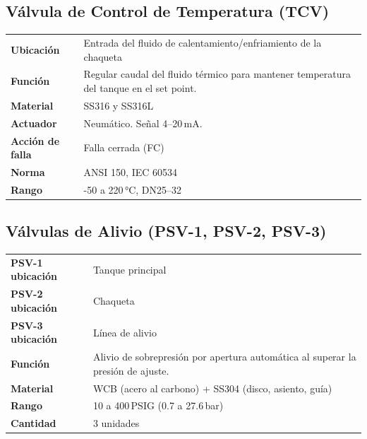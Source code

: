 \documentclass[12pt,letterpaper]{article}
\begin{document}
\subsection{Válvula de Control de Temperatura (TCV)}

\begin{especbox}[title={TCV — SAMSON Tipo 3241 + Actuador 3271}]
\renewcommand{\arraystretch}{1.25}
\begin{tabular}{L{4cm} L{9.5cm}}
\textbf{Ubicación}       & Entrada del fluido de calentamiento/enfriamiento de la chaqueta \\
\textbf{Función}         & Regular caudal del fluido térmico para mantener temperatura del tanque en el set point. \\
\textbf{Material}        & SS316 y SS316L \\
\textbf{Actuador}        & Neumático. Señal 4--20\,mA. \\
\textbf{Acción de falla} & Falla cerrada (FC) \\
\textbf{Norma}           & ANSI 150, IEC 60534 \\
\textbf{Rango}           & -50 a 220\,°C, DN25--32 \\
\end{tabular}
\end{especbox}

\subsection{Válvulas de Alivio (PSV-1, PSV-2, PSV-3)}

\begin{especbox}[title={PSV — Elevación Completa con Resorte, API 520}]
\renewcommand{\arraystretch}{1.25}
\begin{tabular}{L{4cm} L{9.5cm}}
\textbf{PSV-1 ubicación} & Tanque principal \\
\textbf{PSV-2 ubicación} & Chaqueta \\
\textbf{PSV-3 ubicación} & Línea de alivio \\
\textbf{Función}         & Alivio de sobrepresión por apertura automática al superar la presión de ajuste. \\
\textbf{Material}        & WCB (acero al carbono) + SS304 (disco, asiento, guía) \\
\textbf{Rango}           & 10 a 400\,PSIG (0.7 a 27.6\,bar) \\
\textbf{Cantidad}        & 3 unidades \\
\end{tabular}
\end{especbox}
\end{document}
